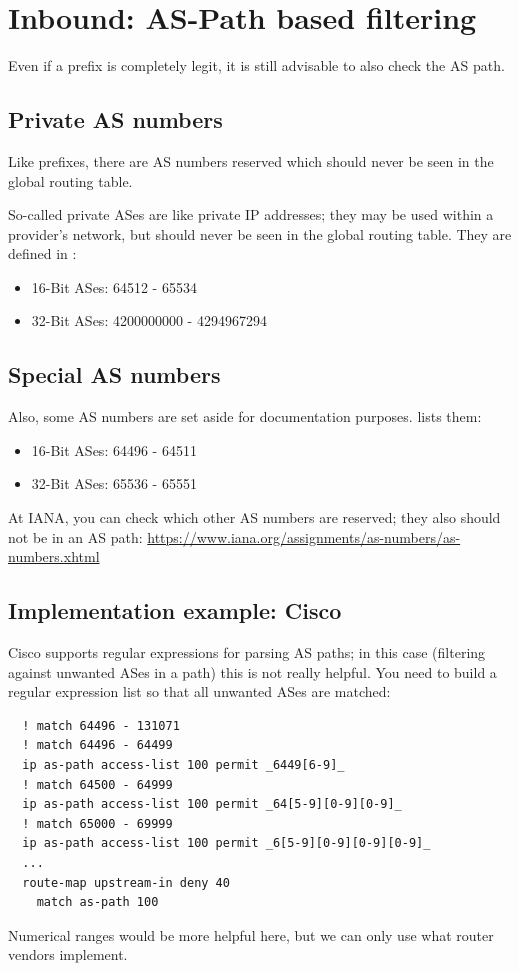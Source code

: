 \section{Inbound: AS-Path based filtering}
Even if a prefix is completely legit, it is still advisable to also check the AS path.

\subsection{Private AS numbers}
Like prefixes, there are AS numbers reserved which should never be seen in the global routing table.

So-called private ASes are like private IP addresses; they may be used within a provider's network, but should never be seen in the global routing table. They are defined in :
\begin{itemize}
  \item 16-Bit ASes: 64512 - 65534
  \item 32-Bit ASes: 4200000000 - 4294967294
\end{itemize}

\subsection{Special AS numbers}
Also, some AS numbers are set aside for documentation purposes.
 lists them:
\begin{itemize}
  \item 16-Bit ASes: 64496 - 64511
  \item 32-Bit ASes: 65536 - 65551
\end{itemize}

At IANA, you can check which other AS numbers are reserved; they also should not be in an AS path: \url{https://www.iana.org/assignments/as-numbers/as-numbers.xhtml}

\subsection{Implementation example: Cisco}
Cisco supports regular expressions for parsing AS paths; in this case (filtering against unwanted ASes in a path) this is not really helpful. You need to build a regular expression list so that all unwanted ASes are matched:
\begin{verbatim}
  ! match 64496 - 131071
  ! match 64496 - 64499
  ip as-path access-list 100 permit _6449[6-9]_
  ! match 64500 - 64999
  ip as-path access-list 100 permit _64[5-9][0-9][0-9]_
  ! match 65000 - 69999
  ip as-path access-list 100 permit _6[5-9][0-9][0-9][0-9]_
  ...
  route-map upstream-in deny 40
    match as-path 100
\end{verbatim}
Numerical ranges would be more helpful here, but we can only use what router vendors implement.

